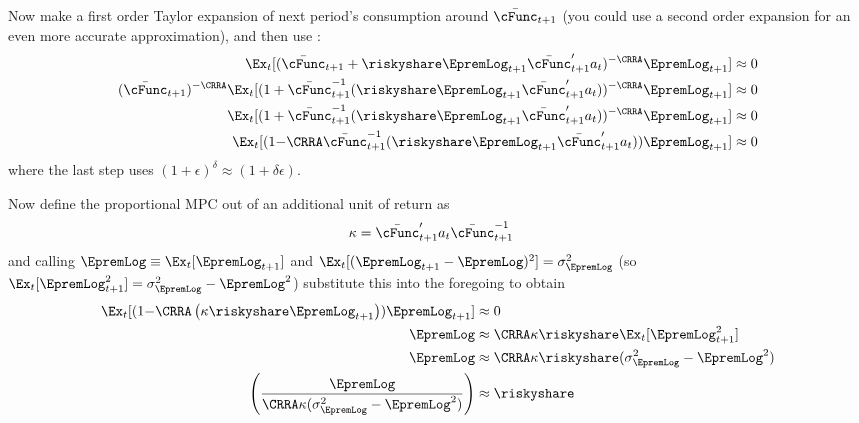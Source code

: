\documentclass{\econtex}
\begin{document}
Now make a first order Taylor expansion of next period's consumption around $\cNxt$ (you could use a second order expansion for an even more accurate approximation), and then use :
\begin{equation}\begin{gathered}\begin{aligned}
      \Ex_{t}[(\cNxt+\riskyshare\EpremLog_{t+1}\bar{\cFunc}^{\prime}_{t+1}{a}_{t}\orderTwo )^{-\CRRA}\EpremLog_{t+1}] & \approx  0
      \\ (\cNxt)^{-\CRRA}
      \Ex_{t}[
      (1+
      \cNxt^{-1}(\riskyshare\EpremLog_{t+1}\bar{\cFunc}^{\prime}_{t+1}{a}_{t}\orderTwo)
      )^{-\CRRA}\EpremLog_{t+1}
      ]
      & \approx  0
      \\ \Ex_{t}[(1+\cNxt^{-1}(\riskyshare\EpremLog_{t+1}\bar{\cFunc}^{\prime}_{t+1}{a}_{t}\orderTwo))^{-\CRRA}\EpremLog_{t+1}]& \approx  0
      \\ 
      \Ex_{t}[
      (1{-\CRRA}
      \cNxt^{-1}(\riskyshare\EpremLog_{t+1}\bar{\cFunc}^{\prime}_{t+1}{a}_{t}\orderTwo)
      )\EpremLog_{t+1}
      ]
      & \approx  0
    \end{aligned}\end{gathered}\end{equation}
where the last step uses $(1+\epsilon)^{\delta} \approx (1+\delta \epsilon)$.

Now define the proportional MPC out of an additional unit of return as
\begin{equation}\begin{gathered}\begin{aligned}
      \kappa & = \bar{\cFunc}^{\prime}_{t+1}{a}_{t}\orderTwo\cNxt^{-1}
    \end{aligned}\end{gathered}\end{equation}
and calling $\EpremLog \equiv \Ex_{t}[\EpremLog_{t+1}]$ and $\Ex_{t}[(\EpremLog_{t+1}-\EpremLog)^{2}]=\sigma^{2}_{\EpremLog}$ (so $\Ex_{t}[\EpremLog_{t+1}^{2}]=\sigma^{2}_{\EpremLog}-\EpremLog^{2}$) substitute this into the foregoing to obtain
\begin{equation}\begin{gathered}\begin{aligned}
      \Ex_{t}[
      (1{-\CRRA}
      \left(
        \kappa\riskyshare \EpremLog_{t+1}
      \right)
      )\EpremLog_{t+1}] & \approx 0
      \\ \EpremLog & \approx      \CRRA   \kappa\riskyshare \Ex_{t}[\EpremLog_{t+1}^{2}      ]
      \\ \EpremLog & \approx      \CRRA   \kappa\riskyshare (\sigma^{2}_{\EpremLog}-\EpremLog^{2})
\\      \left(\frac{\EpremLog}{\CRRA   \kappa(\sigma^{2}_{\EpremLog}-\EpremLog^{2})}\right) & \approx \riskyshare
    \end{aligned}\end{gathered}\end{equation}
\clearpage 

 \econtexBibMake
\end{document}
